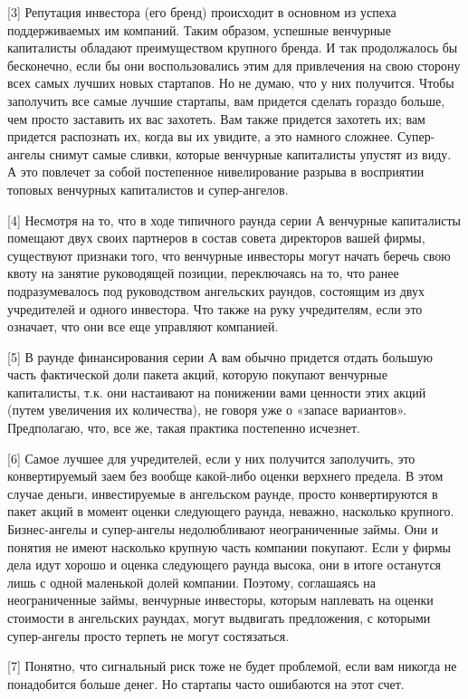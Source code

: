\documentclass[ebook,12pt,oneside,openany]{memoir}
\begin{document}
[3] Репутация инвестора (его бренд) происходит в основном из успеха
поддерживаемых им компаний. Таким образом, успешные венчурные
капиталисты обладают преимуществом крупного бренда. И так продолжалось
бы бесконечно, если бы они воспользовались этим для привлечения на
свою сторону всех самых лучших новых стартапов. Но не думаю, что у них
получится. Чтобы заполучить все самые лучшие стартапы, вам придется
сделать гораздо больше, чем просто заставить их вас захотеть. Вам
также придется захотеть их; вам придется распознать их, когда вы их
увидите, а это намного сложнее. Супер-ангелы снимут самые сливки,
которые венчурные капиталисты упустят из виду. А это повлечет за собой
постепенное нивелирование разрыва в восприятии топовых венчурных
капиталистов и супер-ангелов.

[4] Несмотря на то, что в ходе типичного раунда серии А венчурные
капиталисты помещают двух своих партнеров в состав совета директоров
вашей фирмы, существуют признаки того, что венчурные инвесторы могут
начать беречь свою квоту на занятие руководящей позиции, переключаясь
на то, что ранее подразумевалось под руководством ангельских раундов,
состоящим из двух учредителей и одного инвестора. Что также на руку
учредителям, если это означает, что они все еще управляют компанией.

[5] В раунде финансирования серии А вам обычно придется отдать большую
часть фактической доли пакета акций, которую покупают венчурные
капиталисты, т.к. они настаивают на понижении вами ценности этих акций
(путем увеличения их количества), не говоря уже о «запасе вариантов».
Предполагаю, что, все же, такая практика постепенно исчезнет.

[6] Самое лучшее для учредителей, если у них получится заполучить, это
конвертируемый заем без вообще какой-либо оценки верхнего предела. В
этом случае деньги, инвестируемые в ангельском раунде, просто
конвертируются в пакет акций в момент оценки следующего раунда,
неважно, насколько крупного. Бизнес-ангелы и супер-ангелы
недолюбливают неограниченные займы. Они и понятия не имеют насколько
крупную часть компании покупают. Если у фирмы дела идут хорошо и
оценка следующего раунда высока, они в итоге останутся лишь с одной
маленькой долей компании. Поэтому, соглашаясь на неограниченные займы,
венчурные инвесторы, которым наплевать на оценки стоимости в
ангельских раундах, могут выдвигать предложения, с которыми
супер-ангелы просто терпеть не могут состязаться.

[7] Понятно, что сигнальный риск тоже не будет проблемой, если вам
никогда не понадобится больше денег. Но стартапы часто ошибаются на
этот счет.
\end{document}
